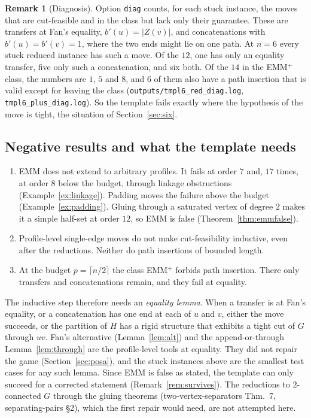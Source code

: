 \documentclass[11pt]{amsart}
\theoremstyle{definition}
\newtheorem{remark}[theorem]{Remark}
\begin{document}
\begin{remark}[Diagnosis]\label{rem:diag}
Option \texttt{diag} counts, for each stuck instance, the moves that are cut-feasible and in the
class but lack only their guarantee. These are transfers at Fan's equality, $b'(u)=|Z(v)|$, and
concatenations with $b'(u)=b'(v)=1$, where the two ends might lie on one path. At $n=6$ every
stuck reduced instance has such a move. Of the $12$, one has only an equality transfer, five only
such a concatenation, and six both. Of the $14$ in the EMM$^+$ class, the numbers are $1$, $5$ and
$8$, and $6$ of them also have a path insertion that is valid except for leaving the class
(\texttt{outputs/tmpl6\_red\_diag.log}, \texttt{tmpl6\_plus\_diag.log}). So the template fails
exactly where the hypothesis of the move is tight, the situation of Section~\ref{sec:six}.
\end{remark}

\subsection*{Negative results and what the template needs}
\begin{enumerate}[label=(\arabic*)]
\item EMM does not extend to arbitrary profiles. It fails at order $7$ and, $17$ times, at order $8$
below the budget, through linkage obstructions (Example~\ref{ex:linkage}). Padding moves the
failure above the budget (Example~\ref{ex:padding}). Gluing through a saturated vertex of degree
$2$ makes it a simple half-set at order $12$, so EMM is false (Theorem~\ref{thm:emmfalse}).
\item Profile-level single-edge moves do not make cut-feasibility inductive, even after the
reductions. Neither do path insertions of bounded length.
\item At the budget $p=\lceil n/2\rceil$ the class EMM$^+$ forbids path insertion. There only
transfers and concatenations remain, and they fail at equality.
\end{enumerate}
The inductive step therefore needs an \emph{equality lemma}. When a transfer is at Fan's equality,
or a concatenation has one end at each of $u$ and $v$, either the move succeeds, or the partition
of $H$ has a rigid structure that exhibits a tight cut of $G$ through $uv$. Fan's alternative
(Lemma~\ref{lem:alt}) and the append-or-through Lemma~\ref{lem:through} are the profile-level tools
at equality. They did not repair the game (Section~\ref{sec:posa}), and the stuck instances above
are the smallest test cases for any such lemma. Since EMM is false as stated, the template can
only succeed for a corrected statement (Remark~\ref{rem:survives}). The reductions to $2$-connected
$G$ through the gluing theorems (two-vertex-separators Thm.~7, separating-pairs \S2), which the
first repair would need, are not attempted here.
\end{document}
